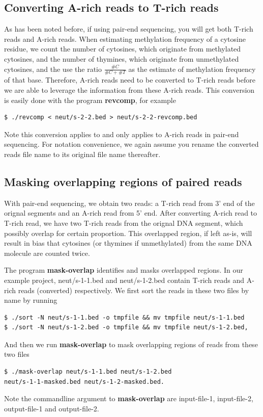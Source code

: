 \documentclass{article}
\begin{document}
\subsection{Converting A-rich reads to T-rich reads}
\label{sec:conv-rich-reads}
As has been noted before, if using pair-end sequencing, you will get
both T-rich reads and A-rich reads. When estimating methylation
frequency of a cytosine residue, we count the number of cytosines,
which originate from methylated cytosines, and the number of thymines,
which originate from unmethylated cytosines, and the use the ratio
$\frac{\#C}{\#C+\#T}$ as the estimate of methylation frequency of that
base. Therefore, A-rich reads need to be converted to T-rich reads
before we are able to leverage the information from these A-rich
reads. This conversion is easily done with the program
\textbf{revcomp}, for example  
\begin{verbatim}
$ ./revcomp < neut/s-2-2.bed > neut/s-2-2-revcomp.bed
\end{verbatim}
Note this conversion applies to and only applies to A-rich reads in
pair-end sequencing. For notation convenience, we again assume you
rename the converted reads file name to its original file name
thereafter.

\subsection{Masking overlapping regions of paired reads}
\label{sec:mask-overl-regi}
With pair-end sequencing, we obtain two reads: a T-rich read from 3'
end of the orignal segments and an A-rich read from 5' end. After
converting A-rich read to T-rich read, we have two T-rich reads from
the orignal DNA segment, which possibly overlap for certain
proportion. This overlapped region, if left as-is, will result in bias
that cytosines (or thymines if unmethylated) from the same DNA
molecule are counted twice. 

The program \textbf{mask-overlap} identifies and masks overlapped
regions. In our example project, neut/s-1-1.bed and neut/s-1-2.bed
contain T-rich reads and A-rich reads (converted) respectively. We
first sort the reads in these two files by name by running
\begin{verbatim}
$ ./sort -N neut/s-1-1.bed -o tmpfile && mv tmpfile neut/s-1-1.bed
$ ./sort -N neut/s-1-2.bed -o tmpfile && mv tmpfile neut/s-1-2.bed,
\end{verbatim}
And then we run \textbf{mask-overlap} to mask overlapping regions of
reads from these two files
\begin{verbatim}
$ ./mask-overlap neut/s-1-1.bed neut/s-1-2.bed 
neut/s-1-1-masked.bed neut/s-1-2-masked.bed.
\end{verbatim}
Note the commandline argument to \textbf{mask-overlap} are
input-file-1, input-file-2, output-file-1 and output-file-2. 
\end{document}
